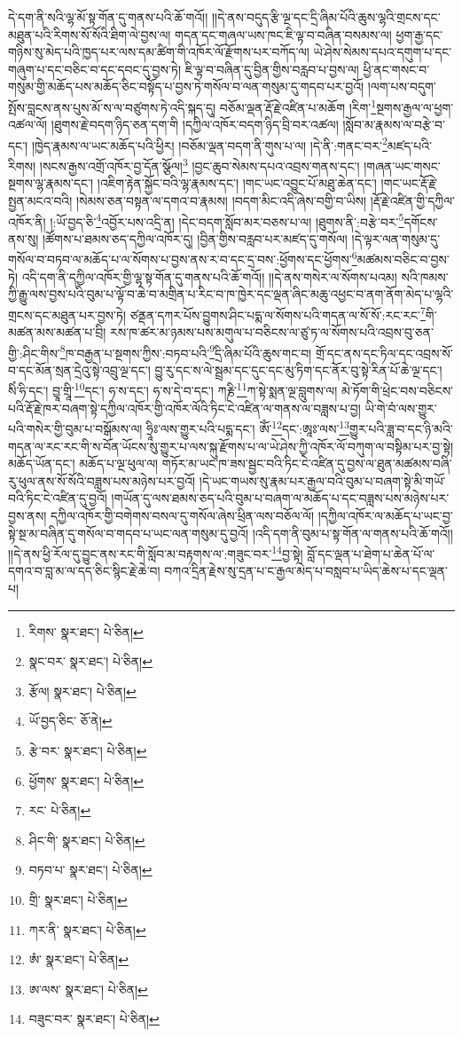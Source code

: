 དེ་དག་ནི་སའི་ལྷ་མོ་སྟ་གོན་དུ་གནས་པའི་ཆོ་གའོ།། །།དེ་ནས་བདུད་རྩི་ལྔ་དང་དྲི་ཞིམ་པོའི་ཆུས་ལྷའི་གྲངས་དང་མཐུན་པའི་རིགས་སོ་སོའི་ཐིག་ལེ་བྱས་ལ། གདན་དང་གཞལ་ཡས་ཁང་ཇི་ལྟ་བ་བཞིན་བསམས་ལ། ཕྱག་རྒྱ་དང་གཉིས་སུ་མེད་པའི་ཁྱད་པར་ལས་དམ་ཚིག་གི་འཁོར་ལོ་རྫོགས་པར་བཀོད་ལ། ཡེ་ཤེས་སེམས་དཔའ་དགུག་པ་དང་གཞུག་པ་དང་བཅིང་བ་དང་དབང་དུ་བྱས་ཏེ། ཇི་ལྟ་བ་བཞིན་དུ་བྱིན་གྱིས་བརླབ་པ་བྱས་ལ། ཕྱི་ནང་གསང་བ་གསུམ་གྱི་མཆོད་པས་མཆོད་ཅིང་བསྟོད་པ་བྱས་ཏེ་གསོལ་བ་ལན་གསུམ་དུ་གདབ་པར་བྱའོ། །ལག་པས་བདུག་སྤོས་བླངས་ནས་པུས་མོ་ས་ལ་བཙུགས་ཏེ་འདི་སྐད་དུ། བཅོམ་ལྡན་རྡོ་རྗེ་འཛིན་པ་མཆོག །རིག་\footnote{རིགས་  སྣར་ཐང་།  པེ་ཅིན། }སྔགས་རྒྱལ་ལ་ཕྱག་འཚལ་ལོ། །ཐུགས་རྗེ་བདག་ཉིད་ཅན་དག་གི །དཀྱིལ་འཁོར་བདག་ཉིད་བྲི་བར་འཚལ། །སློབ་མ་རྣམས་ལ་བརྩེ་བ་དང་། །ཁྱེད་རྣམས་ལ་ཡང་མཆོད་པའི་ཕྱིར། །བཅོམ་ལྡན་བདག་ནི་གུས་པ་ལ། །དེ་ནི་:གནང་བར་\footnote{སྣང་བར་  སྣར་ཐང་།  པེ་ཅིན། }མཛད་པའི་རིགས། །སངས་རྒྱས་འགྲོ་འཁོར་བྱ་དོན་སྩོལ།\footnote{རྩོལ།  སྣར་ཐང་།  པེ་ཅིན། } །བྱང་ཆུབ་སེམས་དཔའ་འབྲས་གནས་དང་། །གཞན་ཡང་གསང་སྔགས་ལྷ་རྣམས་དང་། །འཇིག་རྟེན་སྐྱོང་བའི་ལྷ་རྣམས་དང་། །གང་ཡང་འབྱུང་པོ་མཐུ་ཆེན་དང་། །གང་ཡང་རྡོ་རྗེ་སྤྱན་མངའ་བའི། །སེམས་ཅན་བསྟན་ལ་དགའ་བ་རྣམས། །བདག་མིང་འདི་ཞེས་བགྱི་བ་ཡིས། །རྡོ་རྗེ་འཛིན་གྱི་དཀྱིལ་འཁོར་ནི། །:ཡོ་བྱད་ཅི་\footnote{ཡོ་བྱད་ཅིང་  ཅོ་ནེ། }འབྱོར་པས་འདྲི་ན། །དེང་བདག་སློབ་མར་བཅས་པ་ལ། །ཐུགས་ནི་:བརྩེ་བར་\footnote{རྩེ་བར་  སྣར་ཐང་།  པེ་ཅིན། }དགོངས་ནས་སུ། །ཚོགས་པ་ཐམས་ཅད་དཀྱིལ་འཁོར་དུ། །བྱིན་གྱིས་བརླབ་པར་མཛད་དུ་གསོལ། །དེ་ལྟར་ལན་གསུམ་དུ་གསོལ་བ་བཏབ་ལ་མཆོད་པ་ལ་སོགས་པ་བྱས་ནས་ར་བ་དང་དྲ་བས་:ཕྱོགས་དང་ཕྱོགས་\footnote{ཕྱོགས་  སྣར་ཐང་།  པེ་ཅིན། }མཚམས་བཅིང་བ་བྱས་ཏེ། འདི་དག་ནི་དཀྱིལ་འཁོར་གྱི་ལྷ་སྟ་གོན་དུ་གནས་པའི་ཆོ་གའོ།། །།དེ་ནས་གསེར་ལ་སོགས་པའམ། སའི་ཁམས་ཀྱི་རྒྱུ་ལས་བྱས་པའི་བུམ་པ་ལྟོ་བ་ཆེ་བ་མགྲིན་པ་རིང་བ་ཁ་ཁྱེར་དང་ལྡན་ཞིང་མཆུ་འཕྱང་བ་ནག་ནོག་མེད་པ་ལྷའི་གྲངས་དང་མཐུན་པར་བྱས་ཏེ། ཙནྡན་དཀར་པོས་བྱུགས་ཤིང་པདྨ་ལ་སོགས་པའི་གདན་ལ་སོ་སོ་:རང་རང་\footnote{རང་  པེ་ཅིན། }གི་མཚན་མས་མཚན་པ་བྲི། རས་ཁ་ཚར་མ་ཉམས་པས་མགུལ་པ་བཅིངས་ལ་ཙུ་ཏ་ལ་སོགས་པའི་འབྲས་བུ་ཅན་གྱི་:ཤིང་གིས་\footnote{ཤིང་གི་  སྣར་ཐང་།  པེ་ཅིན། }ཁ་བརྒྱན་པ་སྔགས་ཀྱིས་:བཏབ་པའི་\footnote{བཏབ་པ་  སྣར་ཐང་།  པེ་ཅིན། }དྲི་ཞིམ་པོའི་ཆུས་གང་བ། གྲོ་དང་ནས་དང་ཏིལ་དང་འབྲས་སོ་བ་དང་མོན་སྲན་དྲེའུ་སྟེ་འབྲུ་ལྔ་དང་། བྱུ་རུ་དང་ས་ལེ་སྦྲམ་དང་དུང་དང་མུ་ཏིག་དང་ནོར་བུ་སྟེ་རིན་པོ་ཆེ་ལྔ་དང་། སིཾ་ཧི་དང་། བྱཱ་གྲཱི་\footnote{གྲི་  སྣར་ཐང་།  པེ་ཅིན། }དང་། ཧ་ས་དང་། ཧ་ས་དེ་བ་དང་། ཀརྞི་\footnote{ཀར་ནི་  སྣར་ཐང་།  པེ་ཅིན། }ཀ་སྟེ་སྨན་ལྔ་བླུགས་ལ། མེ་ཏོག་གི་ཕྲེང་བས་བཅིངས་པའི་རྡོ་རྗེ་ཁར་བཞག་སྟེ་དཀྱིལ་འཁོར་གྱི་འཁོར་ལོའི་ཏིང་ངེ་འཛིན་ལ་གནས་ལ་བཟླས་པ་བྱ། ཡི་གེ་བཾ་ལས་གྱུར་པའི་གསེར་གྱི་བུམ་པ་བསྒོམས་ལ། ཧྲཱིཿ་ལས་གྱུར་པའི་པདྨ་དང་། ཨོཾ་\footnote{ཨཾ་  སྣར་ཐང་།  པེ་ཅིན། }དང་:ཨཱཿ་ལས་\footnote{ཨ་ལས་  སྣར་ཐང་།  པེ་ཅིན། }གྱུར་པའི་ཟླ་བ་དང་ཉི་མའི་གདན་ལ་རང་རང་གི་ས་བོན་ཡོངས་སུ་གྱུར་པ་ལས་སྐུ་རྫོགས་པ་ལ་ཡེ་ཤེས་ཀྱི་འཁོར་ལོ་བཀུག་ལ་བསྟིམ་པར་བྱ་སྟེ། མཆོད་ཡོན་དང་། མཆོད་པ་ལྔ་ཕུལ་ལ། གཏོར་མ་ཡང་ཁ་ཟས་སྦྱང་བའི་ཏིང་ངེ་འཛིན་དུ་བྱས་ལ་ཐུན་མཚམས་བཞི་རུ་ཕུལ་ནས་སོ་སོའི་བཟླས་པས་མཉེས་པར་བྱའོ། །དེ་ཡང་གཡས་སུ་རྣམ་པར་རྒྱལ་བའི་བུམ་པ་བཞག་སྟེ་མི་གཡོ་བའི་ཏིང་ངེ་འཛིན་དུ་བྱའོ། །གཡོན་དུ་ལས་ཐམས་ཅད་པའི་བུམ་པ་བཞག་ལ་མཆོད་པ་དང་བཟླས་པས་མཉེས་པར་བྱས་ནས། དཀྱིལ་འཁོར་གྱི་བགེགས་བསལ་དུ་གསོལ་ཞེས་ཕྲིན་ལས་བཅོལ་ལོ། །དཀྱིལ་འཁོར་ལ་མཆོད་པ་ཡང་བྱ་སྟེ་སྔ་མ་བཞིན་དུ་གསོལ་བ་གདབ་པ་ཡང་ལན་གསུམ་དུ་བྱའོ། །འདི་དག་ནི་བུམ་པ་སྟ་གོན་ལ་གནས་པའི་ཆོ་གའོ།། །།དེ་ནས་ཕྱི་རོལ་དུ་བྱུང་ནས་རང་གི་སློབ་མ་བརྟགས་ལ་:གཟུང་བར་\footnote{བཟུང་བར་  སྣར་ཐང་།  པེ་ཅིན། }བྱ་སྟེ། བློ་དང་ལྡན་པ་ཐེག་པ་ཆེན་པོ་ལ་དགའ་བ་བླ་མ་ལ་དད་ཅིང་སྙིང་རྗེ་ཆེ་བ། བཀའ་དྲིན་རྗེས་སུ་དྲན་པ་ང་རྒྱལ་མེད་པ་བསླབ་པ་ཡིད་ཆེས་པ་དང་ལྡན་པ། 